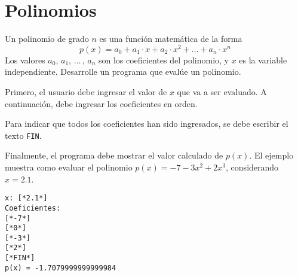 \section{Polinomios}

Un polinomio de grado \(n\)
es una función matemática de la forma
\begin{equation*}
p(x) = a_0
  + a_1 \cdot x
  + a_2 \cdot x^2
  + \hdots
  + a_n \cdot x^n
\end{equation*}
Los valores \(a_0, \, a_1, \, \hdots \, , \, a_n\)
son los coeficientes del polinomio,
y \(x\) es la variable independiente.
Desarrolle un programa que evalúe un polinomio.

Primero, el usuario debe ingresar el valor de $x$ que va a ser evaluado. A continuación, debe ingresar los coeficientes en orden.

Para indicar que todos los coeficientes han sido ingresados, se debe escribir el texto \texttt{FIN}. 

Finalmente, el programa debe mostrar el valor calculado de $p(x)$. El ejemplo muestra como evaluar el polinomio $p(x) = -7 - 3x^2 + 2x^3$, considerando $x = 2.1$.

\begin{lstlisting}[style=consola]
x: [*2.1*]
Coeficientes:
[*-7*]
[*0*]
[*-3*]
[*2*]
[*FIN*]
p(x) = -1.7079999999999984
\end{lstlisting}
